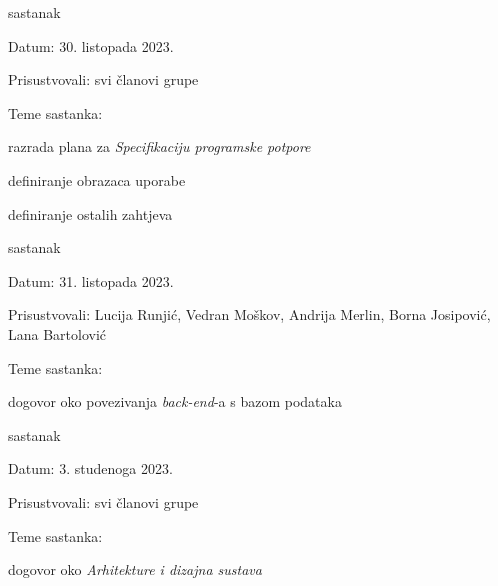 \begin{packed_enum}
			\item sastanak
			
			\item[] \begin{packed_item}
				\item Datum: 30. listopada 2023.
				\item Prisustvovali: svi članovi grupe
				\item Teme sastanka:
				\begin{packed_item}
					\item razrada plana za \textit{Specifikaciju programske potpore}
					\item definiranje obrazaca uporabe
					\item definiranje ostalih zahtjeva
				\end{packed_item}
			\end{packed_item}
			
			\pagebreak
			
			\item sastanak
			
			\item[] \begin{packed_item}
				\item Datum: 31. listopada 2023.
				\item Prisustvovali: Lucija Runjić, Vedran Moškov, Andrija Merlin, Borna Josipović, Lana Bartolović
				\item Teme sastanka:
				\begin{packed_item}
					\item dogovor oko povezivanja \textit{back-end}-a s bazom podataka
				\end{packed_item}
			\end{packed_item}
			
			\item sastanak
			
			\item[] \begin{packed_item}
				\item Datum: 3. studenoga 2023.
				\item Prisustvovali: svi članovi grupe
				\item Teme sastanka:
				\begin{packed_item}
					\item dogovor oko \textit{Arhitekture i dizajna sustava}
				\end{packed_item}
			\end{packed_item}
			

\end{packed_enum}
